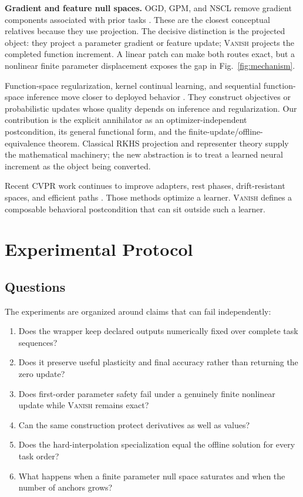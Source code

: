 \documentclass{vanish_ieee}
\theoremstyle{definition}
\newcommand{\VANISH}{\textsc{Vanish}}
\begin{document}
\textbf{Gradient and feature null spaces.}  OGD, GPM, and NSCL remove gradient components associated with prior tasks \cite{bennani2020ogd,saha2021gpm,wang2021nscl}.  These are the closest conceptual relatives because they use projection.  The decisive distinction is the projected object: they project a parameter gradient or feature update; \VANISH{} projects the completed function increment.  A linear patch can make both routes exact, but a nonlinear finite parameter displacement exposes the gap in Fig.~\ref{fig:mechanism}.

Function-space regularization, kernel continual learning, and sequential function-space inference move closer to deployed behavior \cite{titsias2020functional,derakhshani2021kernel,rudner2022sequential}.  They construct objectives or probabilistic updates whose quality depends on inference and regularization.  Our contribution is the explicit annihilator as an optimizer-independent postcondition, its general functional form, and the finite-update/offline-equivalence theorem.  Classical RKHS projection and representer theory \cite{aronszajn1950rkhs,scholkopf2002kernels,micchelli2005vector,rasmussen2006gp} supply the mathematical machinery; the new abstraction is to treat a learned neural increment as the object being converted.

Recent CVPR work continues to improve adapters, rest phases, drift-resistant spaces, and efficient paths \cite{kang2025rest,liu2025lora,li2026faster}.  Those methods optimize a learner.  \VANISH{} defines a composable behavioral postcondition that can sit outside such a learner.

\section{Experimental Protocol}
\label{sec:experiments}

\subsection{Questions}

The experiments are organized around claims that can fail independently:
\begin{enumerate}
  \item Does the wrapper keep declared outputs numerically fixed over complete task sequences?
  \item Does it preserve useful plasticity and final accuracy rather than returning the zero update?
  \item Does first-order parameter safety fail under a genuinely finite nonlinear update while \VANISH{} remains exact?
  \item Can the same construction protect derivatives as well as values?
  \item Does the hard-interpolation specialization equal the offline solution for every task order?
  \item What happens when a finite parameter null space saturates and when the number of anchors grows?
\end{enumerate}
\end{document}
